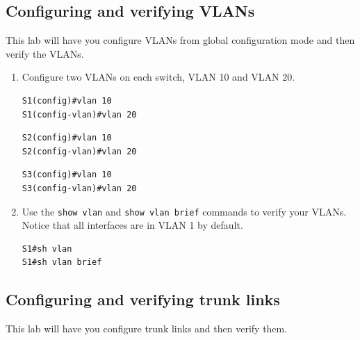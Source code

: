 \documentclass[b5paper,11pt]{memoir}
\begin{document}
\subsection{Configuring and verifying VLANs}

This lab will have you configure VLANs from global configuration mode
and then verify the VLANs.

\begin{enumerate}
\item
  Configure two VLANs on each switch, VLAN 10 and VLAN 20.

\begin{verbatim}
S1(config)#vlan 10
S1(config-vlan)#vlan 20
\end{verbatim}

\begin{verbatim}
S2(config)#vlan 10
S2(config-vlan)#vlan 20
\end{verbatim}

\begin{verbatim}
S3(config)#vlan 10
S3(config-vlan)#vlan 20
\end{verbatim}
\item
  Use the \texttt{show\ vlan} and \texttt{show\ vlan\ brief} commands to
  verify your VLANs. Notice that all interfaces are in VLAN 1 by
  default.

\begin{verbatim}
S1#sh vlan
S1#sh vlan brief
\end{verbatim}
\end{enumerate}

\subsection{Configuring and verifying trunk links}

This lab will have you configure trunk links and then verify them.
\end{document}
